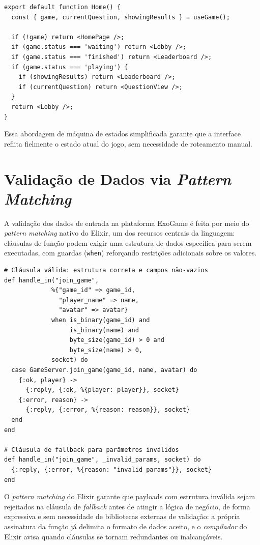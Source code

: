 \documentclass[
	12pt,
	openany,
	oneside,
	a4paper,
	english,
	brazil
]{abntex2}
\begin{document}
\begin{lstlisting}[caption={Roteamento condicional por estado do jogo}, label={lst:routing}]
export default function Home() {
  const { game, currentQuestion, showingResults } = useGame();

  if (!game) return <HomePage />;
  if (game.status === 'waiting') return <Lobby />;
  if (game.status === 'finished') return <Leaderboard />;
  if (game.status === 'playing') {
    if (showingResults) return <Leaderboard />;
    if (currentQuestion) return <QuestionView />;
  }
  return <Lobby />;
}
\end{lstlisting}

Essa abordagem de máquina de estados simplificada garante que a interface reflita fielmente o estado atual do jogo, sem necessidade de roteamento manual.

\section{Validação de Dados via \textit{Pattern Matching}}

A validação dos dados de entrada na plataforma ExoGame é feita por meio do \textit{pattern matching} nativo do Elixir, um dos recursos centrais da linguagem: cláusulas de função podem exigir uma estrutura de dados específica para serem executadas, com guardas (\texttt{when}) reforçando restrições adicionais sobre os valores.

\begin{lstlisting}[caption={Validação via \textit{pattern matching} no Phoenix Channel}, label={lst:dto}]
# Cláusula válida: estrutura correta e campos não-vazios
def handle_in("join_game",
             %{"game_id" => game_id,
               "player_name" => name,
               "avatar" => avatar}
             when is_binary(game_id) and
                  is_binary(name) and
                  byte_size(game_id) > 0 and
                  byte_size(name) > 0,
             socket) do
  case GameServer.join_game(game_id, name, avatar) do
    {:ok, player} ->
      {:reply, {:ok, %{player: player}}, socket}
    {:error, reason} ->
      {:reply, {:error, %{reason: reason}}, socket}
  end
end

# Cláusula de fallback para parâmetros inválidos
def handle_in("join_game", _invalid_params, socket) do
  {:reply, {:error, %{reason: "invalid_params"}}, socket}
end
\end{lstlisting}

O \textit{pattern matching} do Elixir garante que payloads com estrutura inválida sejam rejeitados na cláusula de \textit{fallback} antes de atingir a lógica de negócio, de forma expressiva e sem necessidade de bibliotecas externas de validação: a própria assinatura da função já delimita o formato de dados aceito, e o \textit{compilador} do Elixir avisa quando cláusulas se tornam redundantes ou inalcançáveis.
\end{document}

